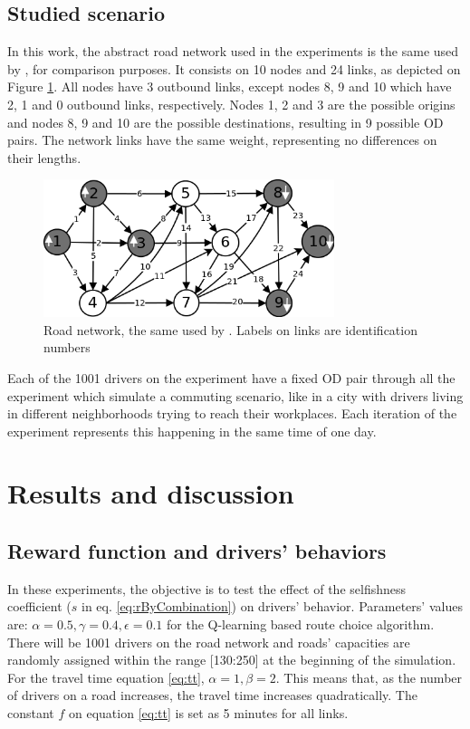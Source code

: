 \documentclass[12pt]{article}
\begin{document}
\subsection{Studied scenario}

In this work, the abstract road network used in the experiments is the same used by \cite{Galib&Moser2011}, for comparison purposes. It consists on 10 nodes and 24 links, as depicted on Figure \ref{fig:roadnetwork}. All nodes have 3 outbound links, except nodes 8, 9 and 10 which have 2, 1 and 0 outbound links, respectively. Nodes 1, 2 and 3 are the possible origins and nodes 8, 9 and 10 are the possible destinations, resulting in 9 possible OD pairs. The network links have the same weight, representing no differences on their lengths.

\begin{figure}[ht]
    \centerline{\includegraphics[width=8.5cm]{img/roadnetwork.png}}
    \caption{Road network, the same used by \cite{Galib&Moser2011}. Labels on links are identification numbers}
    \label{fig:roadnetwork}
\end{figure}

Each of the 1001 drivers on the experiment have a fixed OD pair through all the experiment which simulate a commuting scenario, like in a city with drivers living in different neighborhoods trying to reach their workplaces. Each iteration of the experiment represents this happening in the same time of one day.

\section{Results and discussion}
\label{sec:results}


\subsection{Reward function and drivers' behaviors}
In these experiments, the objective is to test the effect of the selfishness coefficient ($s$ in eq. \eqref{eq:rByCombination}) on drivers' behavior. Parameters' values are: $\alpha = 0.5, \gamma = 0.4, \epsilon = 0.1$ for the Q-learning based route choice algorithm. There will be 1001 drivers on the road network and roads' capacities are randomly assigned within the range [130:250] at the beginning of the simulation. For the travel time equation \eqref{eq:tt}, $\alpha = 1, \beta = 2$. This means that, as the number of drivers on a road increases, the travel time increases quadratically. The constant $f$ on equation \eqref{eq:tt} is set as 5 minutes for all links.
\end{document}
